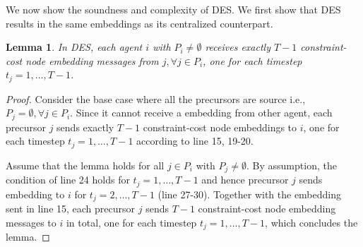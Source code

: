 \documentclass[letterpaper]{article} %
\begin{document}
\newtheorem{proposition}{Proposition}
\newtheorem{lemma}{Lemma}
We now show the soundness and complexity of DES. We first show that DES results in the same embeddings as its centralized counterpart.
\begin{lemma}
In DES, each agent $i$ with $P_i\ne \emptyset$ receives exactly $T-1$ constraint-cost node embedding messages from $j,\forall j\in P_i$, one for each timestep $t_j=1,\dots,T-1$. 
\end{lemma}
\begin{proof}
Consider the base case where all the precursors are source i.e., $P_j=\emptyset,\forall j\in P_i$. Since it cannot receive a embedding from other agent, each precursor $j$ sends exactly $T-1$ constraint-cost node embeddings to $i$, one for each timestep $t_j=1,\dots,T-1$ according to line 15, 19-20.

Assume that the lemma holds for all $j\in P_i$ with $P_j\ne\emptyset$. By assumption, the condition of line 24 holds for $t_j=1,\dots,T-1$ and hence precursor $j$ sends embedding to $i$ for $t_j=2,\dots,T-1$ (line 27-30). Together with the embedding sent in line 15, each precursor $j$ sends $T-1$ constraint-cost node embedding messages to $i$ in total, one for each timestep $t_j=1,\dots,T-1$, which concludes the lemma. 
\end{proof}
\end{document}
